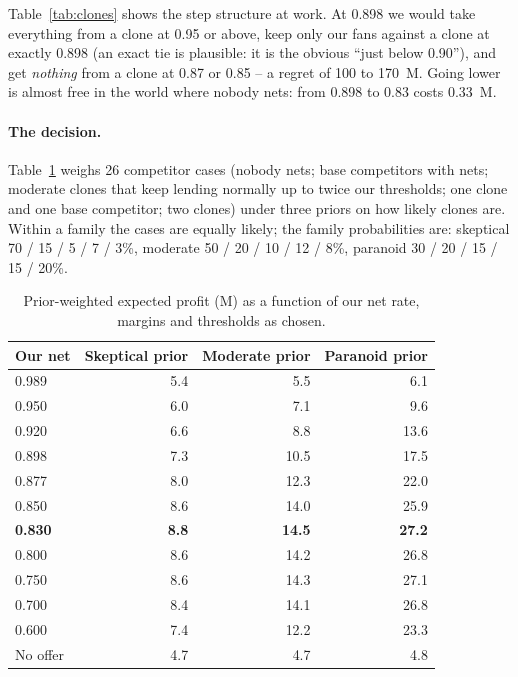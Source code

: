 \documentclass[11pt,a4paper]{article}
\newcommand{\meur}{M\texteuro}
\begin{document}
Table~\ref{tab:clones} shows the step structure at work. At 0.898 we would take everything from a clone at 0.95
or above, keep only our fans against a clone at exactly 0.898 (an exact tie is plausible: it is the obvious
``just below 0.90''), and get \emph{nothing} from a clone at 0.87 or 0.85 -- a regret of 100 to 170~\meur{}.
Going lower is almost free in the world where nobody nets: from 0.898 to 0.83 costs 0.33~\meur{}.

\paragraph{The decision.} Table~\ref{tab:decision} weighs 26 competitor cases (nobody nets; base competitors
with nets; moderate clones that keep lending normally up to twice our thresholds; one clone and one base
competitor; two clones) under three priors on how likely clones are. Within a family the cases are
equally likely; the family probabilities are: skeptical 70 / 15 / 5 / 7 / 3\%, moderate 50 / 20 / 10 / 12 / 8\%,
paranoid 30 / 20 / 15 / 15 / 20\%.

\begin{table}[h]\centering\small
\begin{tabular}{lrrr}
\toprule
Our net & Skeptical prior & Moderate prior & Paranoid prior\\
\midrule
0.989 &  5.4 &  5.5 &  6.1\\
0.950 &  6.0 &  7.1 &  9.6\\
0.920 &  6.6 &  8.8 & 13.6\\
0.898 &  7.3 & 10.5 & 17.5\\
0.877 &  8.0 & 12.3 & 22.0\\
0.850 &  8.6 & 14.0 & 25.9\\
\textbf{0.830} & \textbf{8.8} & \textbf{14.5} & \textbf{27.2}\\
0.800 &  8.6 & 14.2 & 26.8\\
0.750 &  8.6 & 14.3 & 27.1\\
0.700 &  8.4 & 14.1 & 26.8\\
0.600 &  7.4 & 12.2 & 23.3\\
No offer & 4.7 & 4.7 & 4.8\\
\bottomrule
\end{tabular}
\caption{Prior-weighted expected profit (\meur{}) as a function of our net rate, margins and thresholds as
chosen.}
\label{tab:decision}
\end{table}
\end{document}

